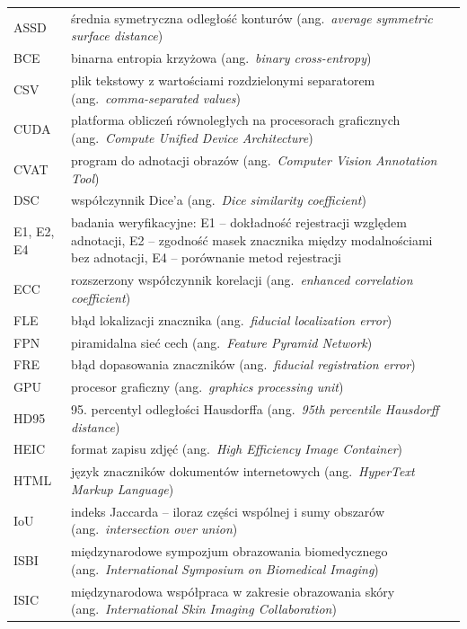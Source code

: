 {\small
\begin{longtable}{@{}p{2.6cm}p{12.2cm}@{}}
  ASSD & średnia symetryczna odległość konturów (ang.~\textit{average symmetric surface distance}) \\
  BCE & binarna entropia krzyżowa (ang.~\textit{binary cross-entropy}) \\
  CSV & plik tekstowy z wartościami rozdzielonymi separatorem (ang.~\textit{comma-separated values}) \\
  CUDA & platforma obliczeń równoległych na procesorach graficznych (ang.~\textit{Compute Unified Device Architecture}) \\
  CVAT & program do adnotacji obrazów (ang.~\textit{Computer Vision Annotation Tool}) \\
  DSC & współczynnik Dice'a (ang.~\textit{Dice similarity coefficient}) \\
  E1, E2, E4 & badania weryfikacyjne: E1 -- dokładność rejestracji względem adnotacji, E2 -- zgodność masek znacznika między modalnościami bez adnotacji, E4 -- porównanie metod rejestracji \\
  ECC & rozszerzony współczynnik korelacji (ang.~\textit{enhanced correlation coefficient}) \\
  FLE & błąd lokalizacji znacznika (ang.~\textit{fiducial localization error}) \\
  FPN & piramidalna sieć cech (ang.~\textit{Feature Pyramid Network}) \\
  FRE & błąd dopasowania znaczników (ang.~\textit{fiducial registration error}) \\
  GPU & procesor graficzny (ang.~\textit{graphics processing unit}) \\
  HD95 & 95. percentyl odległości Hausdorffa (ang.~\textit{95th percentile Hausdorff distance}) \\
  HEIC & format zapisu zdjęć (ang.~\textit{High Efficiency Image Container}) \\
  HTML & język znaczników dokumentów internetowych (ang.~\textit{HyperText Markup Language}) \\
  IoU & indeks Jaccarda -- iloraz części wspólnej i sumy obszarów (ang.~\textit{intersection over union}) \\
  ISBI & międzynarodowe sympozjum obrazowania biomedycznego (ang.~\textit{International Symposium on Biomedical Imaging}) \\
  ISIC & międzynarodowa współpraca w zakresie obrazowania skóry (ang.~\textit{International Skin Imaging Collaboration}) \\

\end{longtable}}
